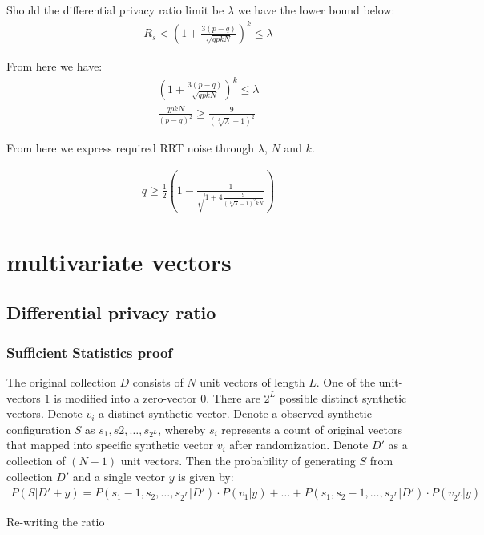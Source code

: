 \documentclass[11pt,draft]{article}
\begin{document}
Should the differential privacy ratio limit be $\lambda$ we have the lower bound below:
\begin{align}
R_s < \left ( 1 + \frac{3(p-q)}{\sqrt{qpkN}} \right )^k  \le \lambda
\end{align}

From here we have:
\begin{align}
\left ( 1 + \frac{3(p-q)}{\sqrt{qpkN}} \right )^k  \le \lambda \\
\frac{qpkN}{(p-q)^2} \ge  \frac{9}{(\sqrt[k]{\lambda} - 1)^2}
\end{align}

From here we express required RRT noise through $\lambda$, $N$ and $k$.

\begin{align}
q \ge \frac{1}{2} \left (1 -  \frac{1}{\sqrt{ 1 + 4 \frac{9}{(\sqrt[k]{\lambda} - 1)^2kN} } } \right ) 
\end{align}

\section{multivariate vectors}

\subsection{Differential privacy ratio}

\subsubsection{Sufficient Statistics proof}

The original collection $D$ consists of $N$ unit vectors of length $L$.  
One of the unit-vectors $1$ is modified into a zero-vector $0$.
There are $2^L$ possible distinct synthetic vectors.
Denote $v_i$ a distinct synthetic vector.
Denote a observed synthetic configuration $S$ as $s_1,s2,\dots,s_{2^L}$, 
whereby $s_i$ represents a count of original vectors that mapped into specific synthetic vector $v_i$ after randomization.
Denote $D'$ as a collection of $(N-1)$ unit vectors.
Then the probability of generating $S$ from collection $D'$ and a single vector $y$ is given by:
\begin{align}
P(S|D'+y) = P(s_1-1,s_2,\dots,s_{2^L}|D') \cdot P(v_1|y) + \dots + P(s_1,s_2-1,\dots,s_{2^L}|D') \cdot P(v_{2^L}|y) 
\end{align}

Re-writing the ratio
\end{document}
